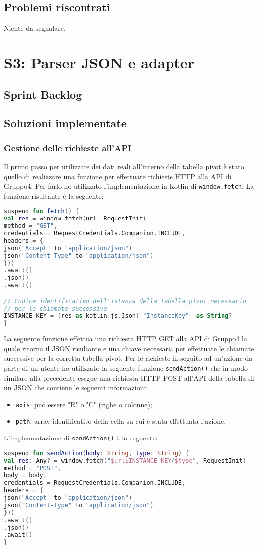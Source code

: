 \subsection{Problemi riscontrati}
Niente da segnalare.
\newpage

\section{S3: Parser JSON e adapter}
\subsection{Sprint Backlog}
\subsection{Soluzioni implementate}
\subsubsection{Gestione delle richieste all'API}
Il primo passo per utilizzare dei dati reali all'interno della tabella pivot è stato quello di realizzare una funzione per effettuare richieste HTTP alla API di Gruppo4. Per farlo ho utilizzato l'implementazione in Kotlin di \verb|window.fetch|. La funzione risultante è la seguente:
\begin{lstlisting}[caption={Funzione fetch()}, label={lst:bodycells}, language=Kotlin]
suspend fun fetch() {
val res = window.fetch(url, RequestInit(
method = "GET",
credentials = RequestCredentials.Companion.INCLUDE,
headers = {
json("Accept" to "application/json")
json("Content-Type" to "application/json")
}))
.await()
.json()
.await()

// Codice identificativo dell'istanza della tabella pivot necessario
// per le chiamate successive
INSTANCE_KEY = (res as kotlin.js.Json)["InstanceKey"] as String?
}
\end{lstlisting}
La seguente funzione effettua una richiesta HTTP GET alla API di Gruppo4 la quale ritorna il JSON risultante e una chiave necessaria per effettuare le chiamate successive per la corretta tabella pivot. Per le richieste in seguito ad un'azione da parte di un utente ho utilizzato la seguente funzione \verb|sendAction()| che in modo similare alla precedente esegue una richiesta HTTP POST all'API della tabella di un JSON che contiene le seguenti informazioni:
\begin{itemize}
	\item \verb|axis|: può essere "R" o "C" (righe o colonne);
	\item \verb|path|: array identificativo della cella su cui è stata effettuata l'azione.
\end{itemize}
L'implementazione di \verb|sendAction()| è la seguente: 
\begin{lstlisting}[caption={Funzione sendAction()}, label={lst:bodycells}, language=Kotlin]
suspend fun sendAction(body: String, type: String) {
val res: Any? = window.fetch("$url$INSTANCE_KEY/$type", RequestInit(
method = "POST",
body = body,
credentials = RequestCredentials.Companion.INCLUDE,
headers = {
json("Accept" to "application/json")
json("Content-Type" to "application/json")
}))
.await()
.json()
.await()
}
\end{lstlisting}
